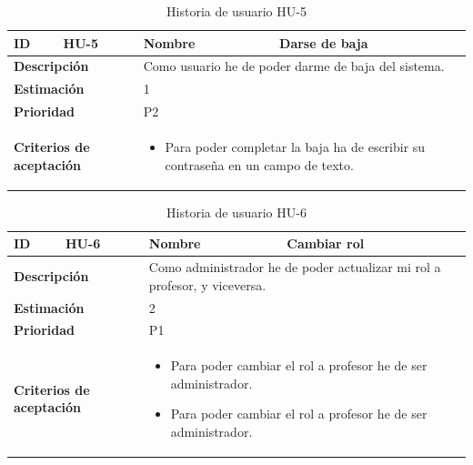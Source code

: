 \begin{table}[H]
    \centering
    \begin{tabular}{|p{2cm}|p{4cm}|p{2cm}|p{4cm}|}
        \hline
        \textbf{ID} & HU-5 & \textbf{Nombre} & Darse de baja \\
        \hline
        \multicolumn{2}{|p{6cm}|}{\textbf{Descripción}} & \multicolumn{2}{p{6cm}|}{Como usuario
        he de poder darme de baja del sistema.} \\
        \hline
        \multicolumn{2}{|p{6cm}|}{\textbf{Estimación}} & \multicolumn{2}{p{6cm}|}{1} \\
        \hline
        \multicolumn{2}{|p{6cm}|}{\textbf{Prioridad}} & \multicolumn{2}{p{6cm}|}{P2} \\
        \hline
        \multicolumn{2}{|p{6cm}|}{\textbf{Criterios de aceptación}} & \multicolumn{2}{p{6cm}|}{
            \begin{itemize}
                \item Para poder completar la baja ha de escribir su contraseña en un campo de texto.
            \end{itemize}
        } \\
        \hline
    \end{tabular}
    \caption{Historia de usuario HU-5}
    \label{tab:hu_5}
\end{table}

\begin{table}[H]
    \centering
    \begin{tabular}{|p{2cm}|p{4cm}|p{2cm}|p{4cm}|}
        \hline
        \textbf{ID} & HU-6 & \textbf{Nombre} & Cambiar rol \\
        \hline
        \multicolumn{2}{|p{6cm}|}{\textbf{Descripción}} & \multicolumn{2}{p{6cm}|}{Como administrador he de poder actualizar mi rol a profesor, y viceversa.} \\
        \hline
        \multicolumn{2}{|p{6cm}|}{\textbf{Estimación}} & \multicolumn{2}{p{6cm}|}{2} \\
        \hline
        \multicolumn{2}{|p{6cm}|}{\textbf{Prioridad}} & \multicolumn{2}{p{6cm}|}{P1} \\
        \hline
        \multicolumn{2}{|p{6cm}|}{\textbf{Criterios de aceptación}} & \multicolumn{2}{p{6cm}|}{
            \begin{itemize}
                \item Para poder cambiar el rol a profesor he de ser administrador.
                \item Para poder cambiar el rol a profesor he de ser administrador.
            \end{itemize}
        } \\
        \hline
    \end{tabular}
    \caption{Historia de usuario HU-6}
    \label{tab:hu_6}
\end{table}

